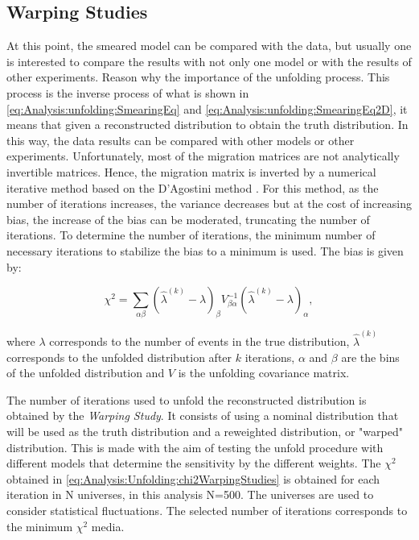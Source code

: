\pagebreak
\subsection{Warping Studies}
\label{Cap:Analysis:Unfolding:WarpingStudies}

At this point, the smeared model can be compared with the data, but usually one is interested to compare the results with not only one model or with the results of other experiments. Reason why the importance of the unfolding process. This process is the inverse process of what is shown in \ref{eq:Analysis:unfolding:SmearingEq} and \ref{eq:Analysis:unfolding:SmearingEq2D}, it means that given a reconstructed distribution to obtain the truth distribution. In this way, the data results can be compared with other models or other experiments. Unfortunately, most of the migration matrices are not analytically invertible matrices. Hence, the migration matrix is inverted by a numerical iterative method based on the D'Agostini method \cite{DAGOSTINI1995487}\cite{dagostini2010improved}. For this method, as the number of iterations increases, the variance decreases but at the cost of increasing bias, the increase of the bias can be moderated, truncating the number of iterations. To determine the number of iterations, the minimum number of necessary iterations to stabilize the bias to a minimum is used. The bias is given by:

\begin{equation}
    \chi^2 = \sum_{\alpha\beta}(\hat{\lambda}^{(k)}-\lambda)_\beta V^{-1}_{\beta\alpha} (\hat{\lambda}^{(k)}-\lambda)_\alpha,
    \label{eq:Analysis:Unfolding:chi2WarpingStudies}
\end{equation}

where $\lambda$ corresponds to the number of events in the true distribution, $\hat{\lambda}^{(k)}$ corresponds to the unfolded distribution after $k$ iterations, $\alpha$ and $\beta$ are the bins of the unfolded distribution and $V$ is the unfolding covariance matrix.  

The number of iterations used to unfold the reconstructed distribution is obtained by the \textit{Warping Study}. It consists of using a nominal distribution that will be used as the truth distribution and a reweighted distribution, or "warped" distribution. This is made with the aim of testing the unfold procedure with different models that determine the sensitivity by the different weights. The $\chi^2$  obtained in \ref{eq:Analysis:Unfolding:chi2WarpingStudies} is obtained for each iteration in N universes, in this analysis N=500. The universes are used to consider statistical fluctuations. The selected number of iterations corresponds to the minimum $\chi^2$ media.

